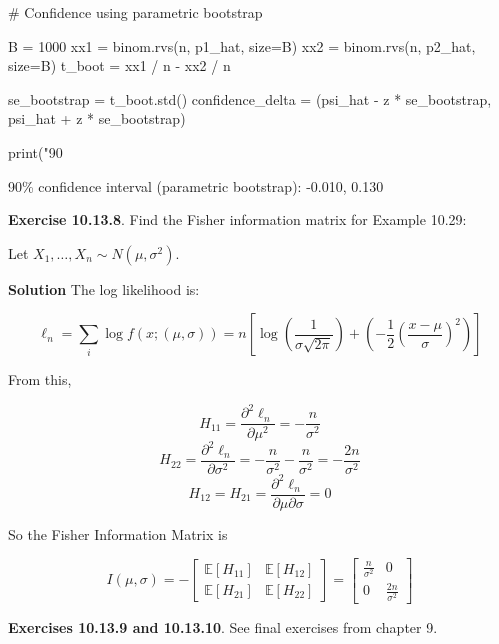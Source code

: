 \begin{python}
# Confidence using parametric bootstrap

B = 1000
xx1 = binom.rvs(n, p1_hat, size=B)
xx2 = binom.rvs(n, p2_hat, size=B)
t_boot = xx1 / n - xx2 / n

se_bootstrap = t_boot.std()
confidence_delta = (psi_hat - z * se_bootstrap, psi_hat + z * se_bootstrap)

print("90%
\end{python}

\begin{console}
90\% confidence interval (parametric bootstrap):          -0.010, 0.130
\end{console}

\textbf{Exercise 10.13.8}. Find the Fisher information matrix for
Example 10.29:

Let \(X_{1}, \dots, X_{n} \sim N(\mu, \sigma^{2})\).

\textbf{Solution} The log likelihood is:

\[\ell_{n} = \sum_{i} \log f(x; (\mu, \sigma))
= n \left[ \log \left( \frac{1}{\sigma \sqrt{2 \pi}} \right) + \left( -\frac{1}{2} \left(\frac{x - \mu}{\sigma} \right)^{2}\right) \right]\]

From this,

\[H_{11} = \frac{\partial^{2} \ell_{n}}{\partial \mu^{2}} = -\frac{n}{\sigma^{2}}\]
\[H_{22} = \frac{\partial^{2} \ell_{n}}{\partial \sigma^{2}} = -\frac{n}{\sigma^{2}} - \frac{n}{\sigma^{2}} = -\frac{2n}{\sigma^{2}}\]
\[H_{12} = H_{21} = \frac{\partial^{2} \ell_{n}}{\partial \mu \partial \sigma} = 0\]

So the Fisher Information Matrix is

\[I(\mu, \sigma) = -\begin{bmatrix}
\mathbb{E}[H_{11}] & \mathbb{E}[H_{12}] \\
\mathbb{E}[H_{21}] & \mathbb{E}[H_{22}]
\end{bmatrix} = \begin{bmatrix}
\frac{n}{\sigma^{2}} & 0 \\
0 & \frac{2n}{\sigma^{2}}
\end{bmatrix}\]

\textbf{Exercises 10.13.9 and 10.13.10}. See final exercises from
chapter 9.
